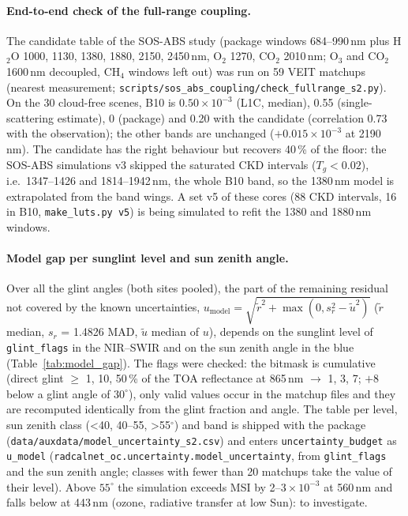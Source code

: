 \documentclass[11pt,a4paper]{article}
\newcommand{\code}[1]{\texttt{#1}}
\begin{document}
\paragraph{End-to-end check of the full-range coupling.} The candidate table of the SOS-ABS study (package windows
684--990\,nm plus H$_2$O 1000, 1130, 1380, 1880, 2150, 2450\,nm, O$_2$ 1270, CO$_2$ 2010\,nm; O$_3$ and CO$_2$
1600\,nm decoupled, CH$_4$ windows left out) was run on 59 VEIT matchups (nearest measurement;
\code{scripts/sos\_abs\_coupling/check\_fullrange\_s2.py}). On the 30 cloud-free scenes, B10 is $0.50\times10^{-3}$
(L1C, median), 0.55 (single-scattering estimate), 0 (package) and 0.20 with the candidate (correlation 0.73 with the
observation); the other bands are unchanged ($+0.015\times10^{-3}$ at 2190\,nm). The candidate has the right
behaviour but recovers 40\,\% of the floor: the SOS-ABS simulations v3 skipped the saturated CKD intervals
($T_g<0.02$), i.e.\ 1347--1426 and 1814--1942\,nm, the whole B10 band, so the 1380\,nm model is extrapolated from the
band wings. A set v5 of these cores (88 CKD intervals, 16 in B10, \code{make\_luts.py v5}) is being simulated to
refit the 1380 and 1880\,nm windows.

\paragraph{Model gap per sunglint level and sun zenith angle.} Over all the glint angles (both sites pooled),
the part of the remaining residual not covered by the known uncertainties,
$u_\mathrm{model} = \sqrt{\tilde r^2 + \max(0, s_r^2 - \tilde u^2)}$ ($\tilde r$ median, $s_r$ = 1.4826 MAD,
$\tilde u$ median of $u$), depends on the sunglint level of \code{glint\_flags} in the NIR--SWIR and on the sun zenith
angle in the blue (Table~\ref{tab:model_gap}). The flags were checked: the bitmask is cumulative (direct glint
$\geq$ 1, 10, 50\,\% of the TOA reflectance at 865\,nm $\to$ 1, 3, 7; $+8$ below a glint angle of $30^\circ$), only valid
values occur in the matchup files and they are recomputed identically from the glint fraction and angle. The table
per level, sun zenith class (<40, 40--55, >55$^\circ$) and band is shipped with the package
(\code{data/auxdata/model\_uncertainty\_s2.csv}) and enters \code{uncertainty\_budget} as \code{u\_model}
(\code{radcalnet\_oc.uncertainty.model\_uncertainty}, from \code{glint\_flags} and the sun zenith angle; classes with
fewer than 20 matchups take the value of their level). Above $55^\circ$ the simulation exceeds MSI by 2--$3\times10^{-3}$
at 560\,nm and falls below at 443\,nm (ozone, radiative transfer at low Sun): to investigate.
\end{document}

